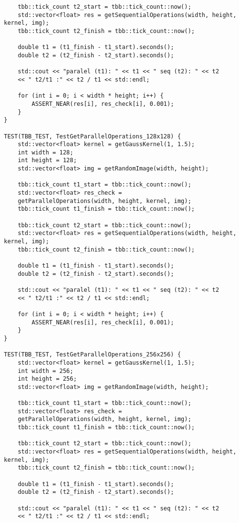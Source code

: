\documentclass{report}
\begin{document}
\begin{lstlisting}
	tbb::tick_count t2_start = tbb::tick_count::now();
	std::vector<float> res = getSequentialOperations(width, height, kernel, img);
	tbb::tick_count t2_finish = tbb::tick_count::now();
	
	double t1 = (t1_finish - t1_start).seconds();
	double t2 = (t2_finish - t2_start).seconds();
	
	std::cout << "paralel (t1): " << t1 << " seq (t2): " << t2
	<< " t2/t1 :" << t2 / t1 << std::endl;
	
	for (int i = 0; i < width * height; i++) {
		ASSERT_NEAR(res[i], res_check[i], 0.001);
	}
}

TEST(TBB_TEST, TestGetParallelOperations_128x128) {
	std::vector<float> kernel = getGaussKernel(1, 1.5);
	int width = 128;
	int height = 128;
	std::vector<float> img = getRandomImage(width, height);
	
	tbb::tick_count t1_start = tbb::tick_count::now();
	std::vector<float> res_check =
	getParallelOperations(width, height, kernel, img);
	tbb::tick_count t1_finish = tbb::tick_count::now();
	
	tbb::tick_count t2_start = tbb::tick_count::now();
	std::vector<float> res = getSequentialOperations(width, height, kernel, img);
	tbb::tick_count t2_finish = tbb::tick_count::now();
	
	double t1 = (t1_finish - t1_start).seconds();
	double t2 = (t2_finish - t2_start).seconds();
	
	std::cout << "paralel (t1): " << t1 << " seq (t2): " << t2
	<< " t2/t1 :" << t2 / t1 << std::endl;
	
	for (int i = 0; i < width * height; i++) {
		ASSERT_NEAR(res[i], res_check[i], 0.001);
	}
}

TEST(TBB_TEST, TestGetParallelOperations_256x256) {
	std::vector<float> kernel = getGaussKernel(1, 1.5);
	int width = 256;
	int height = 256;
	std::vector<float> img = getRandomImage(width, height);
	
	tbb::tick_count t1_start = tbb::tick_count::now();
	std::vector<float> res_check =
	getParallelOperations(width, height, kernel, img);
	tbb::tick_count t1_finish = tbb::tick_count::now();
	
	tbb::tick_count t2_start = tbb::tick_count::now();
	std::vector<float> res = getSequentialOperations(width, height, kernel, img);
	tbb::tick_count t2_finish = tbb::tick_count::now();
	
	double t1 = (t1_finish - t1_start).seconds();
	double t2 = (t2_finish - t2_start).seconds();
	
	std::cout << "paralel (t1): " << t1 << " seq (t2): " << t2
	<< " t2/t1 :" << t2 / t1 << std::endl;
	

\end{lstlisting}
\end{document}
